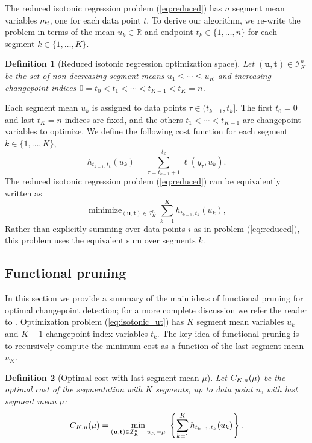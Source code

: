 \documentclass[aoas]{imsart}
\newtheorem{definition}{Definition}
\DeclareMathOperator*{\minimize}{minimize}
\newcommand{\RR}{\mathbb R}
\begin{document}
The reduced isotonic regression problem (\ref{eq:reduced}) has $n$
segment mean variables $m_t$, one for each data point $t$. To derive
our algorithm, we re-write the problem in terms of the mean
$u_k\in\RR$ and endpoint $t_k\in\{1,\dots,n\}$ for each
segment $k\in\{1,\dots, K\}$.
\begin{definition}[Reduced isotonic regression optimization space]
\label{def:Ibar}
  Let $(\mathbf u, \mathbf t)\in{\mathcal I}^n_K$ be the set of
  non-decreasing segment means $u_1\leq\cdots\leq u_K$ and
  increasing changepoint indices $0=t_0<t_1<\cdots<t_{K-1}<t_K=n$.
\end{definition}
Each segment mean $u_k$ is assigned to data points
$\tau\in(t_{k-1},t_k]$. The first $t_0=0$ and last
$t_K=n$ indices are fixed, and the others $t_1<\cdots<t_{K-1}$ are
changepoint variables to optimize. We define the following cost function for each
segment $k\in\{1, \dots, K\}$,
\begin{equation}
  \label{eq:h}
  h_{t_{k-1}, t_k}(u_k) = \sum_{\tau=t_{k-1}+1}^{t_k} \ell(y_\tau, u_k).
\end{equation}
The reduced isotonic regression problem (\ref{eq:reduced}) can be equivalently written as
\begin{equation}
  \label{eq:isotonic_ut}
  \minimize_{(\mathbf u, \mathbf t)\in{\mathcal I}^n_K}
  \sum_{k=1}^K
  h_{t_{k-1}, t_k}(u_k),
\end{equation}
Rather than explicitly summing over data points $i$ as in problem
(\ref{eq:reduced}), this problem uses the equivalent sum over segments $k$. 

\subsection{Functional pruning}
\label{sec:functional-pruning}

In this section we provide a summary of the main ideas of functional
pruning for optimal changepoint detection; for a more complete
discussion we refer the reader to \citep{fpop}. Optimization problem
(\ref{eq:isotonic_ut}) has $K$ segment mean variables $u_k$ and $K-1$
changepoint index variables $t_k$. The key idea of functional pruning
is to recursively compute the minimum cost as a function of the last
segment mean $u_K$.

\begin{definition}[Optimal cost with last segment mean $\mu$]
\label{def:fcc}
  Let $C_{K,n}(\mu)$ be the optimal cost of the segmentation
  with $K$ segments, up to data point $n$, with last segment mean
  $\mu$:
\begin{equation}
\FCC_{K,n}(\mu) = \min_{(\mathbf u, \mathbf t)\in{\mathcal I}^n_K \ | \ u_K = \mu} \
  \left\{ \sum_{k=1}^K
  h_{t_{k-1}, t_k}(u_k) \right\}.
\end{equation}
\end{definition}
\end{document}
